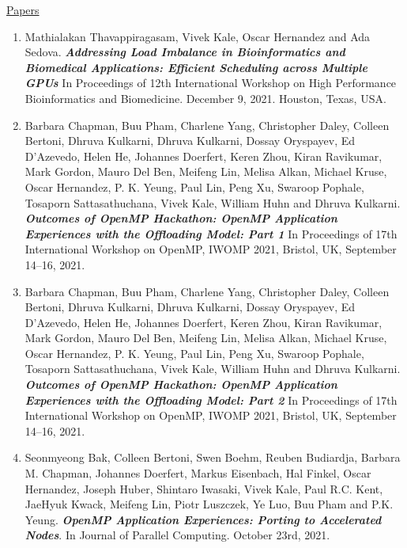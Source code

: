 




\underline{Papers}
\begin{enumerate}
\item Mathialakan Thavappiragasam, Vivek Kale, Oscar Hernandez and  Ada Sedova. \textbf{\textit{Addressing Load Imbalance in Bioinformatics and Biomedical Applications: Efficient Scheduling across Multiple GPUs}} In Proceedings of 12th International Workshop on High Performance Bioinformatics and Biomedicine. December 9, 2021. Houston, Texas, USA. 
\item Barbara Chapman, Buu Pham, Charlene Yang, Christopher Daley, Colleen Bertoni, Dhruva Kulkarni, Dhruva Kulkarni, Dossay Oryspayev, Ed D’Azevedo, Helen He, Johannes Doerfert, Keren Zhou, Kiran Ravikumar, Mark Gordon, Mauro Del Ben, Meifeng Lin, Melisa Alkan, Michael Kruse, Oscar Hernandez, P. K. Yeung, Paul Lin, Peng Xu, Swaroop Pophale, Tosaporn Sattasathuchana, Vivek Kale, William Huhn and Dhruva Kulkarni. \textbf{\textit{Outcomes of OpenMP Hackathon: OpenMP Application Experiences with the Offloading Model: Part 1}} In Proceedings of 17th International Workshop on OpenMP, IWOMP 2021, Bristol, UK, September 14–16, 2021.

\item Barbara Chapman, Buu Pham, Charlene Yang, Christopher Daley, Colleen Bertoni, Dhruva Kulkarni, Dhruva Kulkarni, Dossay Oryspayev, Ed D’Azevedo, Helen He, Johannes Doerfert, Keren Zhou, Kiran Ravikumar, Mark Gordon, Mauro Del Ben, Meifeng Lin, Melisa Alkan, Michael Kruse, Oscar Hernandez, P. K. Yeung, Paul Lin, Peng Xu, Swaroop Pophale, Tosaporn Sattasathuchana, Vivek Kale, William Huhn and Dhruva Kulkarni. \textbf{\textit{Outcomes of OpenMP Hackathon: OpenMP Application Experiences with the Offloading Model: Part 2}} In Proceedings of 17th International Workshop on OpenMP, IWOMP 2021, Bristol, UK, September 14–16, 2021. 

\item Seonmyeong Bak, Colleen Bertoni, Swen Boehm, Reuben Budiardja, Barbara M. Chapman, Johannes Doerfert, Markus Eisenbach, Hal Finkel, Oscar Hernandez, Joseph Huber, Shintaro Iwasaki, Vivek Kale, Paul R.C. Kent, JaeHyuk Kwack, Meifeng Lin, Piotr Luszczek, Ye Luo, Buu Pham and P.K. Yeung. \textbf{\textit{OpenMP Application Experiences: Porting to Accelerated Nodes}}.  In Journal of Parallel Computing. October 23rd, 2021.


\end{enumerate}
